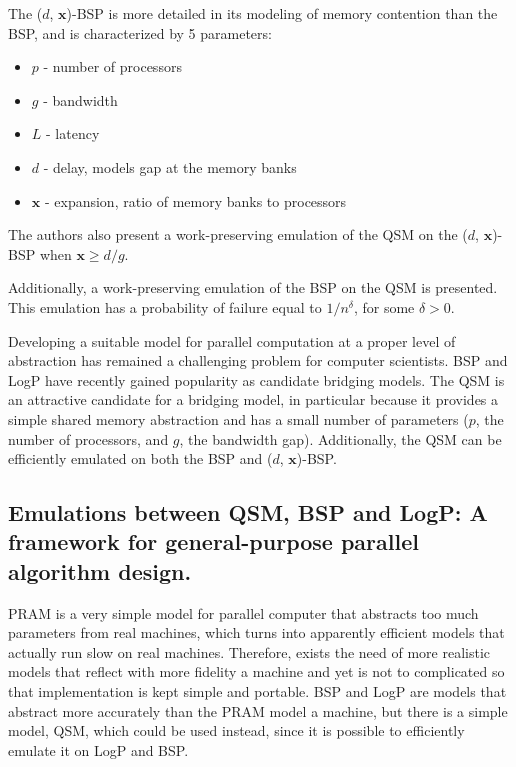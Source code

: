 \documentclass[12pt,a4paper]{article}
\begin{document}
The ($d$, $\textbf{x}$)-BSP is more detailed in its modeling of memory contention than the BSP, and is characterized by 5 parameters:

\begin{itemize}
\item $p$ - number of processors
\item $g$ - bandwidth
\item $L$ - latency
\item $d$ - delay, models gap at the memory banks
\item $\textbf{x}$ - expansion, ratio of memory banks to processors
\end{itemize}

The authors also present a work-preserving emulation of the QSM on the ($d$, $\textbf{x}$)-BSP when $\textbf{x} \geq d / g$.

Additionally, a work-preserving emulation of the BSP on the QSM is presented. This emulation has a probability of failure equal to
$1/n^\delta$, for some $\delta > 0$. 

Developing a suitable model for parallel computation at a proper level of abstraction has remained a challenging problem for computer scientists. BSP and LogP
have recently gained popularity as candidate bridging models. The QSM is an attractive candidate for a bridging model, in particular because it provides a
simple shared memory abstraction and has a small number of parameters ($p$, the number of processors, and $g$, the bandwidth gap). Additionally, the QSM can be
efficiently emulated on both the BSP and ($d$, $\textbf{x}$)-BSP.


\subsection{Emulations between QSM, BSP and LogP: A framework for general-purpose parallel algorithm design. \cite{Vlr03}}

PRAM is a very simple model for parallel computer that abstracts too much parameters from real machines, which turns into apparently efficient models that 
actually run slow on real machines. Therefore, exists the need of more realistic models that reflect with more fidelity a machine and yet is not to 
complicated so that implementation is kept simple and portable. BSP and LogP are models that abstract more accurately than the PRAM model a machine, 
but there is a simple model, QSM, which could be used instead, since it is possible to efficiently emulate it on LogP and BSP.
\end{document}
